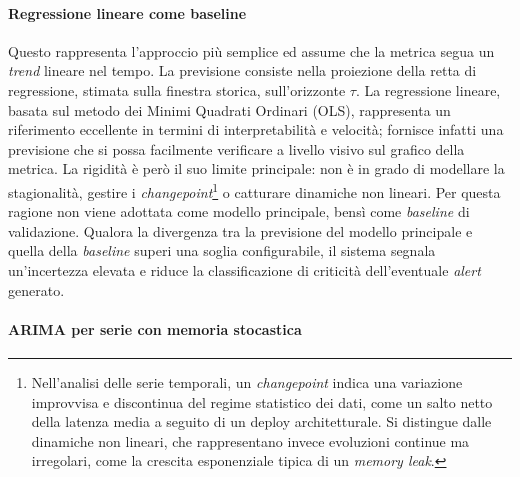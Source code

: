 \paragraph{Regressione lineare come baseline}

Questo rappresenta l'approccio più semplice ed assume che la metrica segua un \textit{trend}
lineare nel tempo. La previsione consiste nella proiezione della retta di regressione, stimata
sulla finestra storica, sull'orizzonte $\tau$. La regressione lineare, basata sul metodo dei 
Minimi Quadrati Ordinari (OLS), rappresenta un riferimento eccellente in termini di interpretabilità 
e velocità; fornisce infatti una previsione che si possa facilmente verificare a livello visivo sul grafico 
della metrica. La rigidità è però il suo limite principale: non è in grado
di modellare la stagionalità, gestire i \textit{changepoint}\footnote{Nell'analisi delle serie temporali, 
un \textit{changepoint} indica una variazione improvvisa e discontinua del regime statistico dei dati, 
come un salto netto della latenza media a seguito di un deploy architetturale. 
Si distingue dalle dinamiche non lineari, che rappresentano invece evoluzioni continue ma irregolari, 
come la crescita esponenziale tipica di un \textit{memory leak}.} o catturare dinamiche non lineari.
Per questa ragione non viene adottata come modello principale, bensì come \textit{baseline} di
validazione. Qualora la divergenza tra la previsione del modello principale e quella della
\textit{baseline} superi una soglia configurabile, il sistema segnala un'incertezza elevata e
riduce la classificazione di criticità dell'eventuale \textit{alert} generato.

\paragraph{ARIMA per serie con memoria stocastica}

